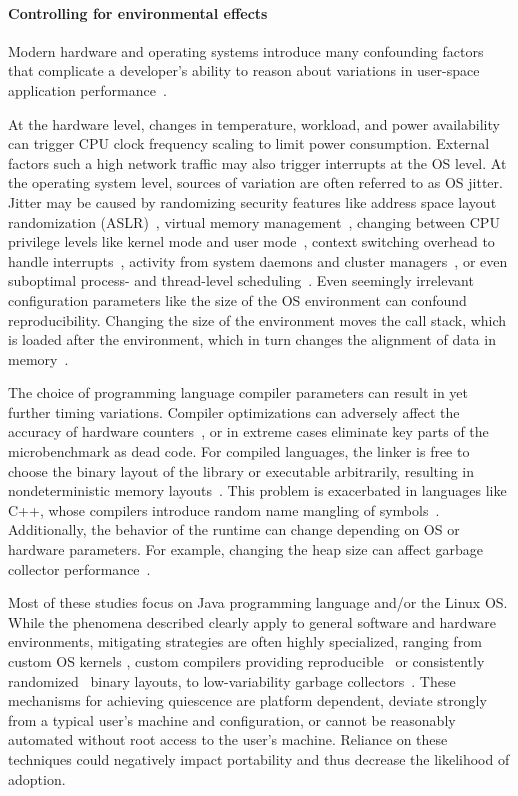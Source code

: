 \documentclass[conference]{IEEEtran}
\begin{document}

\label{sec:environment}
\paragraph{Controlling for environmental effects}
Modern hardware and operating systems introduce many confounding factors that
complicate a developer's ability to reason about variations in user-space
application performance~\cite{HP5e}.

At the hardware level, changes in temperature, workload, and power availability
can trigger CPU clock frequency scaling to limit power consumption.
External factors such a high network traffic may also trigger interrupts at the
OS level.
At the operating system level, sources of variation are often referred to as
OS jitter.
Jitter may be caused by randomizing security features like address space layout
randomization (ASLR)~\cite{Shacham2004},
virtual memory management~\cite{Oyama2014,Oyama2016},
changing between CPU privilege levels like kernel mode and user mode~\cite{Zaparanuks2009},
context switching overhead to handle interrupts~\cite{Tsafrir2007},
activity from system daemons and cluster managers~\cite{Petrini2003},
or even suboptimal process- and thread-level scheduling~\cite{Lozi2016}.
Even seemingly irrelevant configuration parameters like the size of the
OS environment can confound reproducibility. Changing the size of the
environment moves the call stack, which is loaded after the environment, which
in turn changes the alignment of data in memory~\cite{Mytkowicz2009}.

The choice of programming language compiler parameters can result in yet
further timing variations.
Compiler optimizations can adversely affect the accuracy of hardware
counters~\cite{Zaparanuks2009}, or in extreme cases eliminate key parts of the
microbenchmark as dead code.
For compiled languages, the linker is free to choose the binary layout of the
library or executable arbitrarily, resulting in nondeterministic memory
layouts~\cite{Georges2008}. This problem is exacerbated in languages like C++,
whose compilers introduce random name mangling of symbols~\cite{Kalibera2005}.
Additionally, the behavior of the runtime can change depending on OS or hardware
parameters. For example, changing the heap size can affect garbage collector
performance~\cite{Blackburn2004}.

Most of these studies focus on Java programming language and/or the Linux OS.
While the phenomena described clearly apply to general software and hardware environments,
mitigating strategies are often highly specialized, ranging from custom OS
kernels \cite{Tessellation,Akkan2012}, custom compilers providing
reproducible~\cite{Georges2008} or consistently randomized~\cite{Curtsinger2013}
binary layouts, to low-variability garbage collectors~\cite{Huang2004}.
These mechanisms for achieving quiescence are platform dependent, deviate strongly
from a typical user's machine and configuration, or cannot be reasonably automated without
root access to the user's machine. Reliance on these techniques could negatively impact
portability and thus decrease the likelihood of adoption.
\end{document}
